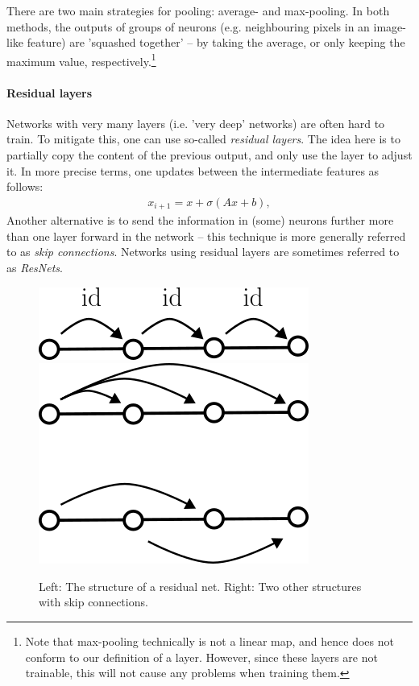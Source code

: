 \documentclass{article}
\begin{document}
There are two main strategies for pooling: average- and max-pooling. In both methods, the outputs of groups of neurons (e.g. neighbouring pixels in an image-like feature) are 'squashed together' -- by taking the average, or only keeping the maximum value, respectively.\footnote{Note that max-pooling technically is not a linear map, and hence does not conform to our definition of a layer. However, since these layers are not trainable, this will not cause any problems when training them.} 



\paragraph{Residual layers} Networks with very many layers (i.e. 'very deep' networks) are often hard to train. To mitigate this, one can use so-called \emph{residual layers}. The idea here is to partially copy the content of the previous output, and only use the layer to adjust it. In more precise terms, one updates between the intermediate features as follows:
\begin{align*}
    x_{i+1} =  x + \sigma(Ax + b),
\end{align*}
Another alternative is to send the information in (some) neurons further more than one layer forward in the network -- this technique is more generally referred to as \emph{skip connections}. Networks using residual layers are sometimes referred to as \emph{ResNets}. \newline 

\begin{figure}
    \centering
    \includegraphics[width=0.45\linewidth]{graphics/resnet.png}\includegraphics[width=0.45\linewidth]{graphics/skip_connections.png}
    \caption{Left: The structure of a residual net. Right: Two other structures with skip connections.}
    \label{fig:skip_con}
\end{figure}
\end{document}
